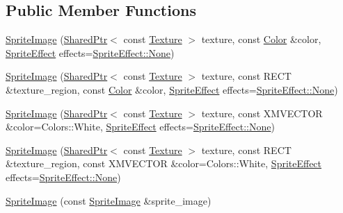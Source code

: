\subsection*{Public Member Functions}
\begin{DoxyCompactItemize}
\item 
\hyperlink{classmage_1_1_sprite_image_ad57c748cdc09bdf57ef22613c3841e72}{Sprite\+Image} (\hyperlink{namespacemage_a1e01ae66713838a7a67d30e44c67703e}{Shared\+Ptr}$<$ const \hyperlink{classmage_1_1_texture}{Texture} $>$ texture, const \hyperlink{structmage_1_1_color}{Color} \&color, \hyperlink{namespacemage_a9cfe18123066ba4236f548f9de75d881}{Sprite\+Effect} effects=\hyperlink{namespacemage_a5e7e18b0154373ce8fc942fe3f6b27fda6adf97f83acf6453d4a6a4b1070f3754}{Sprite\+Effect\+::\+None})
\item 
\hyperlink{classmage_1_1_sprite_image_a96e866ff2ae156f0bacff7d9f1a5dfc2}{Sprite\+Image} (\hyperlink{namespacemage_a1e01ae66713838a7a67d30e44c67703e}{Shared\+Ptr}$<$ const \hyperlink{classmage_1_1_texture}{Texture} $>$ texture, const R\+E\+CT \&texture\+\_\+region, const \hyperlink{structmage_1_1_color}{Color} \&color, \hyperlink{namespacemage_a9cfe18123066ba4236f548f9de75d881}{Sprite\+Effect} effects=\hyperlink{namespacemage_a5e7e18b0154373ce8fc942fe3f6b27fda6adf97f83acf6453d4a6a4b1070f3754}{Sprite\+Effect\+::\+None})
\item 
\hyperlink{classmage_1_1_sprite_image_a2024fb5153614870644ef9dcb7f671ac}{Sprite\+Image} (\hyperlink{namespacemage_a1e01ae66713838a7a67d30e44c67703e}{Shared\+Ptr}$<$ const \hyperlink{classmage_1_1_texture}{Texture} $>$ texture, const X\+M\+V\+E\+C\+T\+OR \&color=Colors\+::\+White, \hyperlink{namespacemage_a9cfe18123066ba4236f548f9de75d881}{Sprite\+Effect} effects=\hyperlink{namespacemage_a5e7e18b0154373ce8fc942fe3f6b27fda6adf97f83acf6453d4a6a4b1070f3754}{Sprite\+Effect\+::\+None})
\item 
\hyperlink{classmage_1_1_sprite_image_a4b06d4b5394e5237bedb43ddb9f551f1}{Sprite\+Image} (\hyperlink{namespacemage_a1e01ae66713838a7a67d30e44c67703e}{Shared\+Ptr}$<$ const \hyperlink{classmage_1_1_texture}{Texture} $>$ texture, const R\+E\+CT \&texture\+\_\+region, const X\+M\+V\+E\+C\+T\+OR \&color=Colors\+::\+White, \hyperlink{namespacemage_a9cfe18123066ba4236f548f9de75d881}{Sprite\+Effect} effects=\hyperlink{namespacemage_a5e7e18b0154373ce8fc942fe3f6b27fda6adf97f83acf6453d4a6a4b1070f3754}{Sprite\+Effect\+::\+None})
\item 
\hyperlink{classmage_1_1_sprite_image_a7ce3b568dc3ff96e7467a8d00bba997d}{Sprite\+Image} (const \hyperlink{classmage_1_1_sprite_image}{Sprite\+Image} \&sprite\+\_\+image)

\end{DoxyCompactItemize}

